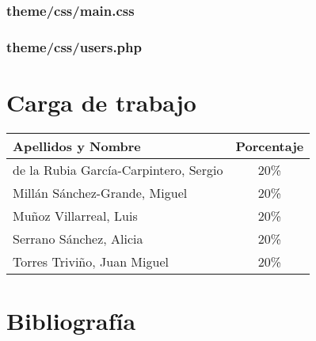 \documentclass[12pt,a4paper,spanish,twoside]{article}
\begin{document}
\subsubsection{theme/css/main.css}


\subsubsection{theme/css/users.php}


\section{Carga de trabajo}
\begin{center}
 \begin{tabular}{|p{10cm}|c|}\hline 
  Apellidos y Nombre & Porcentaje \\ \hline \hline
  de la Rubia García-Carpintero, Sergio & 20\% \\ \hline
  Millán Sánchez-Grande, Miguel & 20\% \\ \hline
  Muñoz Villarreal, Luis & 20\% \\ \hline
  Serrano Sánchez, Alicia & 20\% \\ \hline
  Torres Triviño, Juan Miguel & 20\% \\ \hline 
 \end{tabular}
\end{center}

\section{Bibliografía}
\end{document}

